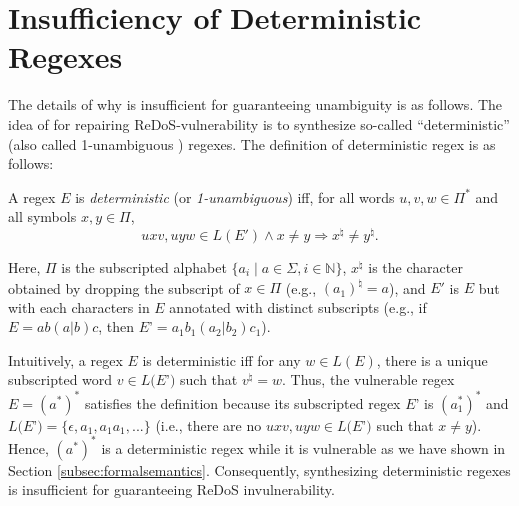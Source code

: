 \documentclass[conference]{IEEEtran}
\newcommand{\tchanged}[2]{#2}
\begin{document}
 
\section{Insufficiency of Deterministic Regexes}
\label{appendix:insufficiency_of_flashregex}
The details of why \cite{FlashRegex} is insufficient for guaranteeing unambiguity is as follows. The idea of \cite{FlashRegex} for repairing ReDoS-vulnerability is to synthesize so-called ``deterministic'' (also called 1-unambiguous \cite{BRUGGEMANNKLEIN1998182,10.1007/3-540-57273-2_45}) regexes. The definition of deterministic regex is as follows:
\begin{definition}
\normalfont
A regex $E$ is {\em deterministic} (or {\em 1-unambiguous}) iff, for all words $u,v,w \in \Pi^*$ and all symbols $x,y \in \Pi$, \[
uxv, uyw \in L(E') \land x \not= y \Rightarrow x^\natural \not= y^\natural.
\]
\end{definition}
Here, $\Pi$ is the subscripted alphabet $\{ a_i \mid a \in \Sigma, i \in \mathbb{N}\}$, $x^\natural$ is the character obtained by dropping the subscript of $x \in \Pi$ (e.g., $(a_1)^\natural = a$), and $E'$ is $E$ but with each characters in $E$ annotated with distinct subscripts (e.g., if $E = ab(a|b)c$, then $E$’$ = a_1 b_1 (a_2 | b_2) c_1$). 

Intuitively, a regex $E$ \tchanged{}{is} deterministic iff for any $w \in L(E)$, there is a unique subscripted word $v \in L(E$’$)$ such that $v^\natural = w$. Thus, the vulnerable regex $E = (a^*)^*$ satisfies the definition because its subscripted regex $E$' is $(a_1^*)^*$ and $L(E$’$) = \{\epsilon, a_1, a_1 a_1, ...\}$ (i.e., there are no $uxv, uyw \in L(E$’$)$ such that $x \neq y$). Hence, $(a^*)^*$ is a deterministic regex while it is vulnerable as we have shown in Section \ref{subsec:formalsemantics}. Consequently, synthesizing deterministic regexes is insufficient for guaranteeing ReDoS invulnerability. 
\end{document}
